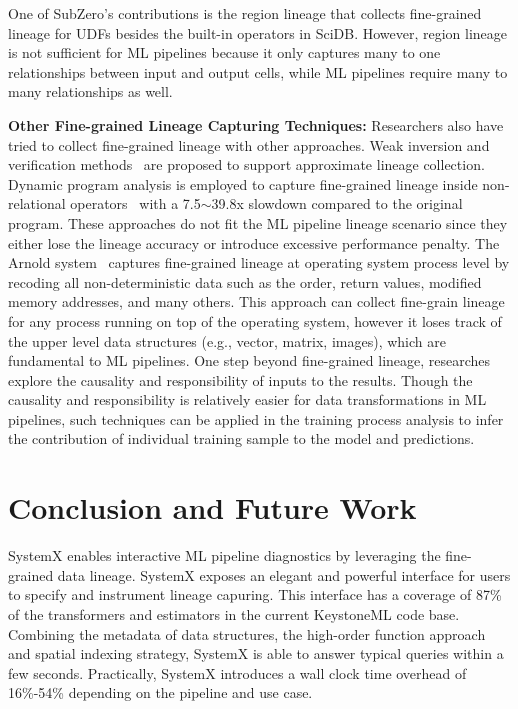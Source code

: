 \documentclass{sig-alternate}
\begin{document}
One of SubZero's contributions is the region lineage that collects fine-grained lineage for UDFs besides the built-in operators in SciDB. 
However, region lineage is not sufficient for ML pipelines because it only captures many to one relationships between input and output cells, 
while ML pipelines require many to many relationships as well.

{\bf Other Fine-grained Lineage Capturing Techniques:} Researchers also have tried to collect fine-grained lineage with other approaches.
Weak inversion and verification methods~\cite{woodruff97} are proposed to support approximate lineage collection.
Dynamic program analysis is employed to capture fine-grained lineage inside non-relational operators~\cite{zhang07} with 
a 7.5$\sim$39.8x slowdown compared to the original program. 
These approaches do not fit the ML pipeline lineage scenario since they either lose the lineage accuracy or introduce
excessive performance penalty.
The Arnold system~\cite{devecsery14} captures fine-grained lineage at operating system process level by recoding
all non-deterministic data such as the order, return values, modified memory addresses, and many others. 
This approach can collect fine-grain lineage for any process running on top of the operating system, however
it loses track of the upper level data structures (e.g., vector, matrix, images), which are fundamental to ML pipelines.
One step beyond fine-grained lineage, researches~\cite{meliou10, meliou11} explore the causality and responsibility
of inputs to the results. Though the causality and responsibility is relatively easier for data transformations in ML pipelines,
such techniques can be applied in the training process analysis to infer the contribution of individual training sample to the 
model and predictions.


\section{Conclusion and Future Work}
\label{sec:Conclusion}
SystemX enables interactive ML pipeline diagnostics by leveraging the fine-grained data lineage.
SystemX exposes an elegant and powerful interface for users to specify and instrument lineage capuring.
This interface has a coverage of 87\% of the transformers and estimators in the current KeystoneML code base. 
Combining the metadata of data structures, the high-order function approach and spatial indexing
strategy, SystemX is able to answer typical queries within a few seconds. 
Practically, SystemX introduces a wall clock time overhead of 16\%-54\% depending on the pipeline 
and use case.
\end{document}
